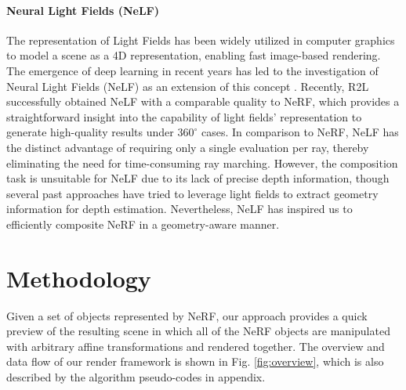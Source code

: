 \documentclass[letterpaper]{article} %
\begin{document}
\paragraph{Neural Light Fields (NeLF)}
The representation of Light Fields has been widely utilized in computer graphics to model a scene as a 4D representation, enabling fast image-based rendering. The emergence of deep learning in recent years has led to the investigation of Neural Light Fields (NeLF) as an extension of this concept
\cite{meng2019high,wizadwongsa2021nex,attal2022learning,sitzmann2021light,suhail2022light}. Recently, R2L \cite{cao2022real, wang2022r2l} successfully obtained NeLF with a comparable quality to NeRF, which provides a straightforward insight into the capability of light fields' representation to generate high-quality results under $360^{\circ}$ cases. In comparison to NeRF, NeLF has the distinct advantage of requiring only a single evaluation per ray, thereby eliminating the need for time-consuming ray marching. However, the composition task is unsuitable for NeLF due to its lack of precise depth information, though several past approaches \cite{1328805, 6910019, Kim2013scene} have tried to leverage light fields to extract geometry information for depth estimation. Nevertheless, NeLF has inspired us to efficiently composite NeRF in a geometry-aware manner.

\section{Methodology}

Given a set of objects represented by NeRF, our approach provides a quick preview of the resulting scene in which all of the NeRF objects are manipulated with arbitrary affine transformations and rendered together. The overview and data flow of our render framework is shown in Fig. \ref{fig:overview}, which is also described by the  algorithm pseudo-codes in appendix.
\end{document}
